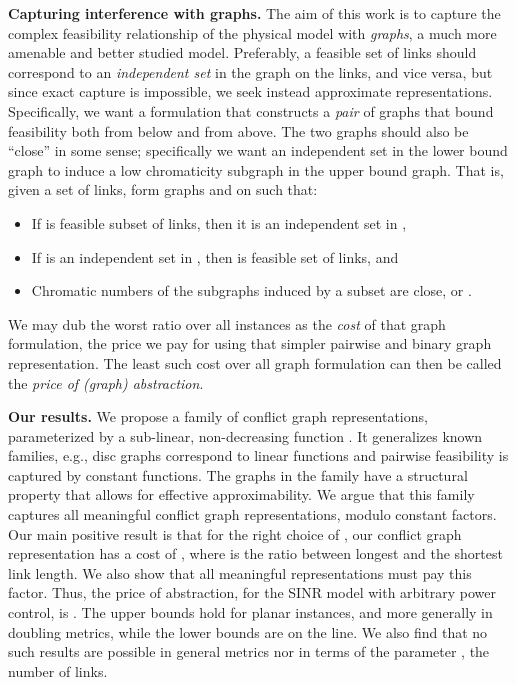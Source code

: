 \documentclass[11pt]{article}
\newcommand{\mypara}[1]{\smallskip\noindent\textbf{#1.}}  \newcommand{\tightpara}[1]{\noindent\textbf{#1.}}
\begin{document}
\mypara{Capturing interference with graphs}
The aim of this work is to capture the complex feasibility relationship of the physical model with \emph{graphs}, a much
more amenable and better studied model. Preferably, a feasible set of links should correspond to an \emph{independent
  set} in the graph on the links, and vice versa, but since exact capture is impossible, we seek instead approximate
representations. Specifically, we want a formulation that constructs a \emph{pair} of graphs that bound feasibility both
from below and from above. The two graphs should also be ``close'' in some sense; specifically we want an independent
set in the lower bound graph to induce a low chromaticity subgraph in the upper bound graph.  That is, given a set 
of links, form graphs  and  on  such that:
\begin{itemize} 
\setlength{\itemsep}{0cm}\setlength{\parskip}{0cm}\item If  is feasible subset of links, then it is an independent set in ,
 \item If  is an independent set in , then  is feasible set of links, and
 \item Chromatic numbers of the subgraphs induced by a subset  are close, or .
\end{itemize}
We may dub the worst ratio  over all instances as the \emph{cost} of that graph formulation, the price we pay for using that simpler pairwise and binary graph representation. The least such cost over all graph formulation can then be called the \emph{price of (graph) abstraction}.

\mypara{Our results}
We propose a family of conflict graph representations, parameterized by a sub-linear, non-decreasing function .
It generalizes known families, e.g., disc graphs correspond to linear functions  and pairwise feasibility is captured by constant functions. The graphs in the family have a structural property that allows for effective approximability.
We argue that this family captures all meaningful conflict graph representations, modulo constant factors. Our main positive result is that for the right choice of , our conflict graph representation has a cost of , where  is the ratio between longest and the shortest link length. 
We also show that all meaningful representations must pay this  factor.
Thus, the price of abstraction, for the SINR model with arbitrary power control, is .
The upper bounds hold for planar instances, and more generally in doubling metrics, while the lower bounds are on the line. We also find that no such results are possible in general metrics nor in terms of the parameter , the number of links.
\end{document}
